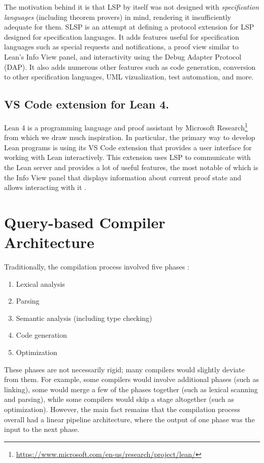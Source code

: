 The motivation behind it is that LSP by itself was not designed with \textit{specification languages}
(including theorem provers) in mind, rendering it insufficiently adequate for them.
SLSP is an attempt at defining a protocol extension for LSP designed for specification languages.
It adds features useful for specification languages such as special requests and notifications,
a proof view similar to Lean's Info View panel, and interactivity using the Debug Adapter Protocol (DAP).
It also adds numerous other features such as code generation, conversion to other specification languages,
UML vizualization, test automation, and more.

\subsection{VS Code extension for Lean 4.}

Lean 4 \cite{deMouraUllrich2021} is a programming language and proof assistant
by Microsoft Research\footnote{\url{https://www.microsoft.com/en-us/research/project/lean/}}
from which we draw much inspiration.
In particular, the primary way to develop Lean programs is using its VS Code
extension that provides a user interface for working with Lean interactively.
This extension uses LSP to communicate with the Lean server and provides a lot
of useful features, the most notable of which is the Info View panel that
displays information about current proof state and allows interacting with it \cite{Nawrocki2023}.

\section{Query-based Compiler Architecture}

Traditionally, the compilation process involved five phases \cite{dragon-book}:
\begin{enumerate}
  \item Lexical analysis
  \item Parsing
  \item Semantic analysis (including type checking)
  \item Code generation
  \item Optimization
\end{enumerate}

These phases are not necessarily rigid; many compilers would slightly deviate from them.
For example, some compilers would involve additional phases (such as linking),
some would merge a few of the phases together (such as lexical scanning and parsing),
while some compilers would skip a stage altogether (such as optimization).
However, the main fact remains that the compilation process overall had a linear pipeline
architecture, where the output of one phase was the input to the next phase.

